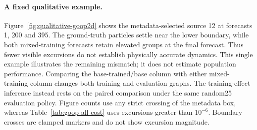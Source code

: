 \paragraph{A fixed qualitative example.}
Figure~\ref{fig:qualitative-goop2d} shows the metadata-selected source 12 at
forecasts 1, 200 and 395. The ground-truth particles settle near the lower
boundary, while both mixed-training forecasts retain elevated groups at the
final forecast. Thus fewer visible excursions do not establish physically
accurate dynamics. This single example illustrates the remaining mismatch;
it does not estimate population performance. Comparing the base-trained/base
column with either mixed-training column changes both training and evaluation
graphs. The training-effect inference instead rests on the paired comparison
under the same random25 evaluation policy. Figure counts use any strict
crossing of the metadata box, whereas Table~\ref{tab:goop-all-cost} uses
excursions greater than $10^{-6}$. Boundary crosses are clamped markers and do
not show excursion magnitude.
